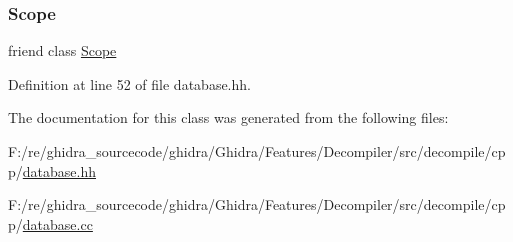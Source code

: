 \subsubsection{\texorpdfstring{Scope}{Scope}}
{\footnotesize\ttfamily friend class \mbox{\hyperlink{class_scope}{Scope}}\hspace{0.3cm}{\ttfamily [friend]}}



Definition at line 52 of file database.\+hh.



The documentation for this class was generated from the following files\+:\begin{DoxyCompactItemize}
\item 
F\+:/re/ghidra\+\_\+sourcecode/ghidra/\+Ghidra/\+Features/\+Decompiler/src/decompile/cpp/\mbox{\hyperlink{database_8hh}{database.\+hh}}\item 
F\+:/re/ghidra\+\_\+sourcecode/ghidra/\+Ghidra/\+Features/\+Decompiler/src/decompile/cpp/\mbox{\hyperlink{database_8cc}{database.\+cc}}\end{DoxyCompactItemize}
